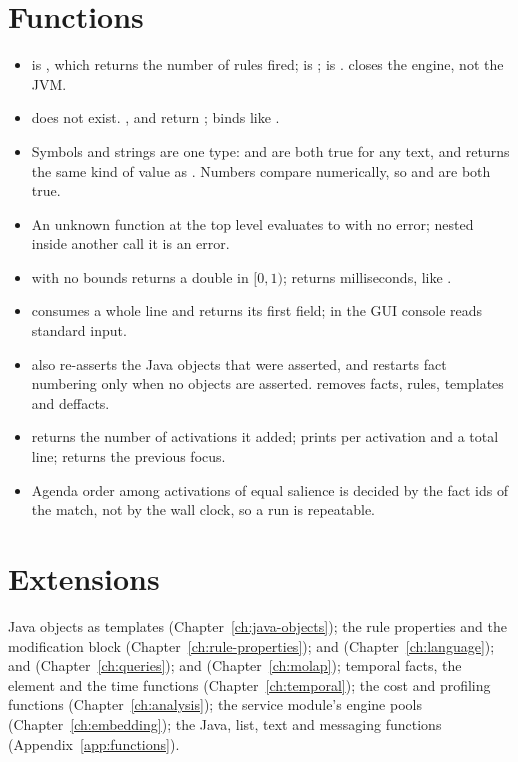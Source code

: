 \section{Functions}

\begin{itemize}
\item {} is , which returns the number of rules fired;
   is ;  is .
   closes the engine, not the JVM.
\item {} does not exist. ,  and
   return ;  binds 
  like .
\item Symbols and strings are one type:  and 
  are both true for any text, and  returns the same kind of
  value as . Numbers compare numerically, so  and  are both true.
\item An unknown function at the top level evaluates to  with
  no error; nested inside another call it is an error.
\item {} with no bounds returns a double in $[0,1)$; 
  returns milliseconds, like .
\item {} consumes a whole line and returns its first field;
   in the GUI console reads standard input.
\item {} also re-asserts the Java objects that were asserted,
  and restarts fact numbering only when no objects are asserted.
   removes facts, rules, templates and deffacts.
\item {} returns the number of activations it added;
   prints  per activation and
  a total line;  returns the previous focus.
\item Agenda order among activations of equal salience is decided by
  the fact ids of the match, not by the wall clock, so a run is
  repeatable.
\end{itemize}

\section{Extensions}

Java objects as templates (Chapter~\ref{ch:java-objects}); the rule
properties and the \fn{<<=} modification block
(Chapter~\ref{ch:rule-properties});  and 
(Chapter~\ref{ch:language});  and 
(Chapter~\ref{ch:queries});  and 
(Chapter~\ref{ch:molap}); temporal facts, the  element and
the time functions (Chapter~\ref{ch:temporal}); the cost and profiling
functions (Chapter~\ref{ch:analysis}); the service module's engine pools
(Chapter~\ref{ch:embedding}); the Java, list, text and messaging
functions (Appendix~\ref{app:functions}).

